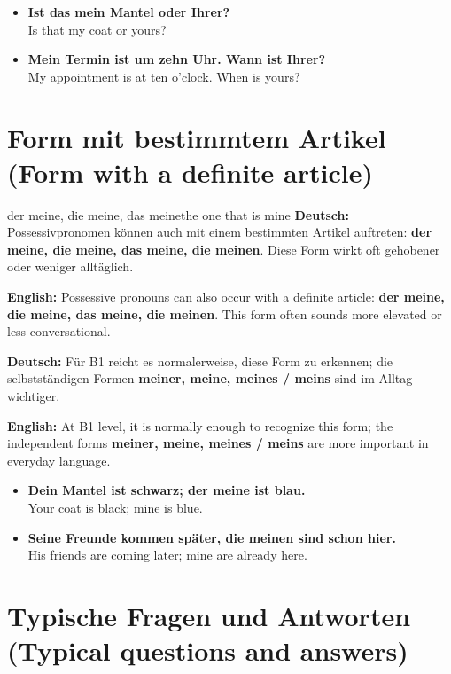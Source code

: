 \documentclass[a4paper,11pt]{article}
\newcommand{\GermanText}[1]{\textbf{Deutsch: }#1\par}
\newcommand{\EnglishText}[1]{{\small\color{SoftGray}\textbf{English: }#1\par}}
\newcommand{\ExampleItem}[2]{\item \textbf{#1}\\{\small\color{SoftGray}#2}}
\begin{document}
        \begin{exbox}
            \begin{itemize}
                \ExampleItem{Ist das mein Mantel oder Ihrer?}{Is that my coat or yours?}
                \ExampleItem{Mein Termin ist um zehn Uhr. Wann ist Ihrer?}{My appointment is at ten o'clock. When is yours?}
            \end{itemize}
        \end{exbox}

    \section{Form mit bestimmtem Artikel \textnormal{(Form with a definite article)}}

        \begin{grammarentry}{der meine, die meine, das meine}{the one that is mine}
            \GermanText{Possessivpronomen können auch mit einem bestimmten Artikel auftreten: \textbf{der meine, die meine, das meine, die meinen}. Diese Form wirkt oft gehobener oder weniger alltäglich.}
            \EnglishText{Possessive pronouns can also occur with a definite article: \textbf{der meine, die meine, das meine, die meinen}. This form often sounds more elevated or less conversational.}

            \GermanText{Für B1 reicht es normalerweise, diese Form zu erkennen; die selbstständigen Formen \textbf{meiner, meine, meines / meins} sind im Alltag wichtiger.}
            \EnglishText{At B1 level, it is normally enough to recognize this form; the independent forms \textbf{meiner, meine, meines / meins} are more important in everyday language.}
        \end{grammarentry}

        \begin{exbox}
            \begin{itemize}
                \ExampleItem{Dein Mantel ist schwarz; der meine ist blau.}{Your coat is black; mine is blue.}
                \ExampleItem{Seine Freunde kommen später, die meinen sind schon hier.}{His friends are coming later; mine are already here.}
            \end{itemize}
        \end{exbox}

    \section{Typische Fragen und Antworten \textnormal{(Typical questions and answers)}}
\end{document}
